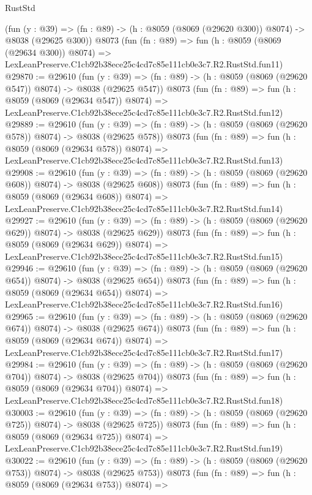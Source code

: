 \begin{lexlean}{RustStd}
\begin{coremodule}
    (fun (y : @39) => (fn : @89) -> (h : @8059 (@8069 (@29620 @300)) @8074) -> @8038 (@29625 @300))
    @8073
    (fun (fn : @89) =>
    fun (h : @8059 (@8069 (@29634 @300)) @8074) =>
    LexLeanPreserve.C1cb92b38ece25c4cd7c85e111cb0e3c7.R2.RustStd.fun11)
@29870 := @29610
    (fun (y : @39) => (fn : @89) -> (h : @8059 (@8069 (@29620 @547)) @8074) -> @8038 (@29625 @547))
    @8073
    (fun (fn : @89) =>
    fun (h : @8059 (@8069 (@29634 @547)) @8074) =>
    LexLeanPreserve.C1cb92b38ece25c4cd7c85e111cb0e3c7.R2.RustStd.fun12)
@29889 := @29610
    (fun (y : @39) => (fn : @89) -> (h : @8059 (@8069 (@29620 @578)) @8074) -> @8038 (@29625 @578))
    @8073
    (fun (fn : @89) =>
    fun (h : @8059 (@8069 (@29634 @578)) @8074) =>
    LexLeanPreserve.C1cb92b38ece25c4cd7c85e111cb0e3c7.R2.RustStd.fun13)
@29908 := @29610
    (fun (y : @39) => (fn : @89) -> (h : @8059 (@8069 (@29620 @608)) @8074) -> @8038 (@29625 @608))
    @8073
    (fun (fn : @89) =>
    fun (h : @8059 (@8069 (@29634 @608)) @8074) =>
    LexLeanPreserve.C1cb92b38ece25c4cd7c85e111cb0e3c7.R2.RustStd.fun14)
@29927 := @29610
    (fun (y : @39) => (fn : @89) -> (h : @8059 (@8069 (@29620 @629)) @8074) -> @8038 (@29625 @629))
    @8073
    (fun (fn : @89) =>
    fun (h : @8059 (@8069 (@29634 @629)) @8074) =>
    LexLeanPreserve.C1cb92b38ece25c4cd7c85e111cb0e3c7.R2.RustStd.fun15)
@29946 := @29610
    (fun (y : @39) => (fn : @89) -> (h : @8059 (@8069 (@29620 @654)) @8074) -> @8038 (@29625 @654))
    @8073
    (fun (fn : @89) =>
    fun (h : @8059 (@8069 (@29634 @654)) @8074) =>
    LexLeanPreserve.C1cb92b38ece25c4cd7c85e111cb0e3c7.R2.RustStd.fun16)
@29965 := @29610
    (fun (y : @39) => (fn : @89) -> (h : @8059 (@8069 (@29620 @674)) @8074) -> @8038 (@29625 @674))
    @8073
    (fun (fn : @89) =>
    fun (h : @8059 (@8069 (@29634 @674)) @8074) =>
    LexLeanPreserve.C1cb92b38ece25c4cd7c85e111cb0e3c7.R2.RustStd.fun17)
@29984 := @29610
    (fun (y : @39) => (fn : @89) -> (h : @8059 (@8069 (@29620 @704)) @8074) -> @8038 (@29625 @704))
    @8073
    (fun (fn : @89) =>
    fun (h : @8059 (@8069 (@29634 @704)) @8074) =>
    LexLeanPreserve.C1cb92b38ece25c4cd7c85e111cb0e3c7.R2.RustStd.fun18)
@30003 := @29610
    (fun (y : @39) => (fn : @89) -> (h : @8059 (@8069 (@29620 @725)) @8074) -> @8038 (@29625 @725))
    @8073
    (fun (fn : @89) =>
    fun (h : @8059 (@8069 (@29634 @725)) @8074) =>
    LexLeanPreserve.C1cb92b38ece25c4cd7c85e111cb0e3c7.R2.RustStd.fun19)
@30022 := @29610
    (fun (y : @39) => (fn : @89) -> (h : @8059 (@8069 (@29620 @753)) @8074) -> @8038 (@29625 @753))
    @8073
    (fun (fn : @89) =>
    fun (h : @8059 (@8069 (@29634 @753)) @8074) =>

\end{coremodule}
\end{lexlean}

